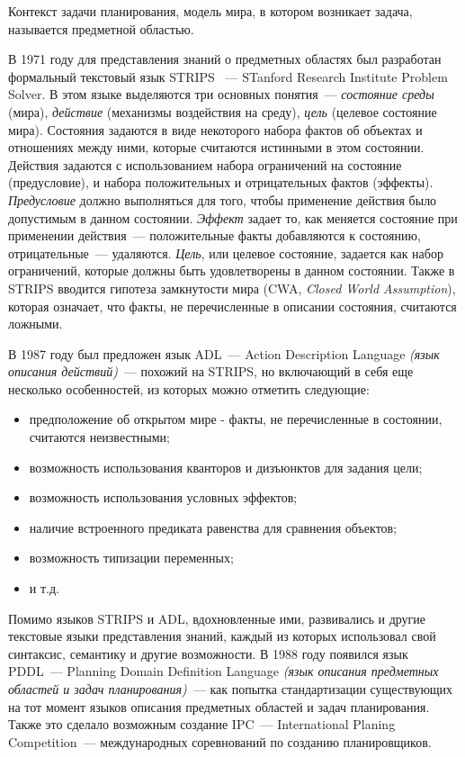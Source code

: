 \documentclass[a4paper,14pt]{extreport}
\begin{document}
	Контекст задачи планирования, модель мира, в котором возникает задача,  называется предметной областью.  
	
	В 1971 году для представления знаний о предметных областях был разработан формальный текстовый язык STRIPS \cite{strips}~--- STanford Research Institute Problem Solver. В этом языке выделяются три основных понятия~--- \textit{состояние среды} (мира), \textit{действие} (механизмы воздействия на среду), \textit{цель} (целевое состояние мира). Состояния задаются в виде некоторого набора фактов об объектах и отношениях между ними, которые считаются истинными в этом состоянии. Действия задаются с использованием набора ограничений на состояние (предусловие), и набора положительных и отрицательных фактов (эффекты). \textit{Предусловие} должно выполняться для того, чтобы применение действия было допустимым в данном состоянии. \textit{Эффект} задает то, как меняется состояние при применении действия~--- положительные факты добавляются к состоянию, отрицательные~--- удаляются. \textit{Цель}, или целевое состояние, задается как набор ограничений, которые должны быть удовлетворены в данном состоянии. Также в STRIPS вводится гипотеза замкнутости мира (CWA, \textit{Closed World Assumption}), которая означает, что факты, не перечисленные в описании состояния, считаются ложными.
	
	В 1987 году был предложен язык ADL~--- Action Description Language \textit{(язык описания действий)}~--- похожий на STRIPS, но включающий в себя еще несколько особенностей, из которых можно отметить следующие:
	\begin{itemize}
	    \item предположение об открытом мире - факты, не перечисленные в состоянии, считаются неизвестными;
	    \item возможность использования кванторов и дизъюнктов для задания цели;
	    \item возможность использования условных эффектов;
	    \item наличие встроенного предиката равенства для сравнения объектов;
	    \item возможность типизации переменных;
	    \item и т.д.
	\end{itemize}
    
    Помимо	языков STRIPS и ADL, вдохновленные ими, развивались и другие текстовые языки представления знаний, каждый из которых использовал свой синтаксис, семантику и другие возможности. В 1988 году появился язык PDDL\cite{pddl3}~--- Planning Domain Definition Language \textit{(язык описания предметных областей и задач планирования)}~--- как попытка стандартизации существующих на тот момент языков описания предметных областей и задач планирования. Также это сделало возможным создание IPC~--- International Planing Competition~--- международных соревнований по созданию планировщиков.  
    
\end{document}
